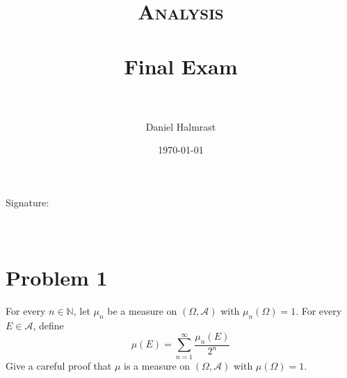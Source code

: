 \documentclass[fontsize=11pt]{scrartcl} %
\title{	
\normalfont \normalsize 
\textsc{Analysis} \\ [25pt] %
\horrule{0.5pt} \\[0.4cm] %
\huge Final Exam \\ %
\horrule{2pt} \\[0.5cm] %
}
\author{Daniel Halmrast} %
\date{\normalsize\today} %
\numberwithin{equation}{section} %
\numberwithin{figure}{section} %
\numberwithin{table}{section} %
\newcommand{\N}{\mathbb{N}}
\begin{document}
\maketitle %

Signature:
\\
\\
\\

\section*{Problem 1}
For every $n\in\N$, let $\mu_n$ be a measure on $(\Omega,\mathscr{A})$ with
$\mu_n(\Omega)=1$. For every $E\in\mathscr{A}$, define
\[
    \mu(E) = \sum_{n=1}^{\infty}\frac{\mu_n(E)}{2^n}
\]
Give a careful proof that $\mu$ is a measure on $(\Omega,\mathscr{A})$ with
$\mu(\Omega)=1$.
\\
\end{document}
